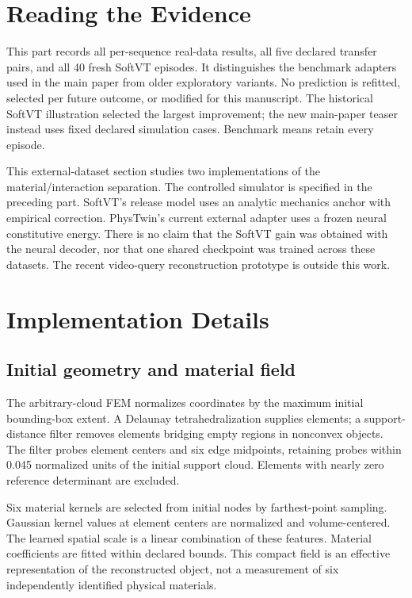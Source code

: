 \documentclass[10pt,twocolumn,letterpaper]{article}
\begin{document}
\section{Reading the Evidence}
This part records all per-sequence real-data results, all five declared transfer pairs, and all 40 fresh SoftVT episodes. It distinguishes the benchmark adapters used in the main paper from older exploratory variants. No prediction is refitted, selected per future outcome, or modified for this manuscript. The historical SoftVT illustration selected the largest improvement; the new main-paper teaser instead uses fixed declared simulation cases. Benchmark means retain every episode.

This external-dataset section studies two implementations of the material/interaction separation. The controlled simulator is specified in the preceding part. SoftVT's release model uses an analytic mechanics anchor with empirical correction. PhysTwin's current external adapter uses a frozen neural constitutive energy. There is no claim that the SoftVT gain was obtained with the neural decoder, nor that one shared checkpoint was trained across these datasets. The recent video-query reconstruction prototype is outside this work.

\section{Implementation Details}
\subsection{Initial geometry and material field}
The arbitrary-cloud FEM normalizes coordinates by the maximum initial bounding-box extent. A Delaunay tetrahedralization supplies elements; a support-distance filter removes elements bridging empty regions in nonconvex objects. The filter probes element centers and six edge midpoints, retaining probes within 0.045 normalized units of the initial support cloud. Elements with nearly zero reference determinant are excluded.

Six material kernels are selected from initial nodes by farthest-point sampling. Gaussian kernel values at element centers are normalized and volume-centered. The learned spatial scale is a linear combination of these features. Material coefficients are fitted within declared bounds. This compact field is an effective representation of the reconstructed object, not a measurement of six independently identified physical materials.
\end{document}
